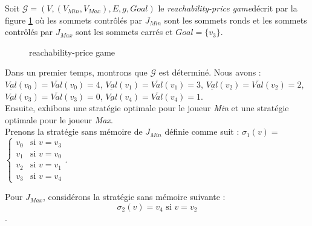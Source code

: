 
\begin{exemple}
	Soit $\mathcal{G} = (V,(V_{Min},V_{Max}),E,g,Goal)$ le \og\textit{reachability-price game}\fg  décrit par la figure \ref{ex:reachPriceGame1} où les sommets contrôlés par $J_{Min}$ sont les sommets ronds et les sommets contrôlés par $J_{Max}$ sont les sommets carrés et $Goal = \{ v_{3} \}$.
	
	\begin{figure}[ht!]
		\centering



		\caption{reachability-price game}
		\label{ex:reachPriceGame1}


	\end{figure}
	
Dans un premier temps, montrons que $\mathcal{G}$ est déterminé. Nous avons : $\underline{Val}(v_{0})=\overline{Val}(v_{0})=4$,  $\underline{Val}(v_{1})=\overline{Val}(v_{1}) =3$, $\underline{Val}(v_{2})=\overline{Val}(v_{2})= 2$,  $\underline{Val}(v_{3})=\overline{Val}(v_{3})= 0$, $\underline{Val}(v_{4})=\overline{Val}(v_{4})= 1$.\\


Ensuite, exhibons une stratégie optimale pour le joueur \textit{Min} et une stratégie optimale pour le joueur \textit{Max}.\\

\noindent Prenons la stratégie sans mémoire de $J_{Min}$ définie comme suit : $\sigma _{1}(v) = $ $\begin{cases}
																						v_{0} & \text{si }v = v_{3}\\
																						v_{1} & \text{si }v = v_{0}\\
																						v_{2} & \text{si }v = v_{1}\\
																						v_{3} & \text{si }v = v_{4}
																					\end{cases}.$

\noindent Pour $J_{Max}$, considérons la stratégie sans mémoire suivante :$$\sigma _{2}(v) = v_{4}  \text{ si } v = v_{2}$$.\\
																																										
						
\end{exemple}